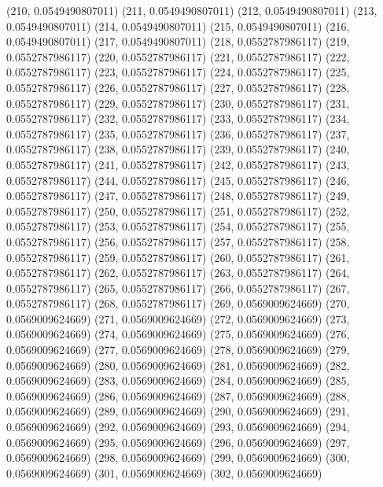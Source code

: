{					(210, 0.0549490807011)
					(211, 0.0549490807011)
					(212, 0.0549490807011)
					(213, 0.0549490807011)
					(214, 0.0549490807011)
					(215, 0.0549490807011)
					(216, 0.0549490807011)
					(217, 0.0549490807011)
					(218, 0.0552787986117)
					(219, 0.0552787986117)
					(220, 0.0552787986117)
					(221, 0.0552787986117)
					(222, 0.0552787986117)
					(223, 0.0552787986117)
					(224, 0.0552787986117)
					(225, 0.0552787986117)
					(226, 0.0552787986117)
					(227, 0.0552787986117)
					(228, 0.0552787986117)
					(229, 0.0552787986117)
					(230, 0.0552787986117)
					(231, 0.0552787986117)
					(232, 0.0552787986117)
					(233, 0.0552787986117)
					(234, 0.0552787986117)
					(235, 0.0552787986117)
					(236, 0.0552787986117)
					(237, 0.0552787986117)
					(238, 0.0552787986117)
					(239, 0.0552787986117)
					(240, 0.0552787986117)
					(241, 0.0552787986117)
					(242, 0.0552787986117)
					(243, 0.0552787986117)
					(244, 0.0552787986117)
					(245, 0.0552787986117)
					(246, 0.0552787986117)
					(247, 0.0552787986117)
					(248, 0.0552787986117)
					(249, 0.0552787986117)
					(250, 0.0552787986117)
					(251, 0.0552787986117)
					(252, 0.0552787986117)
					(253, 0.0552787986117)
					(254, 0.0552787986117)
					(255, 0.0552787986117)
					(256, 0.0552787986117)
					(257, 0.0552787986117)
					(258, 0.0552787986117)
					(259, 0.0552787986117)
					(260, 0.0552787986117)
					(261, 0.0552787986117)
					(262, 0.0552787986117)
					(263, 0.0552787986117)
					(264, 0.0552787986117)
					(265, 0.0552787986117)
					(266, 0.0552787986117)
					(267, 0.0552787986117)
					(268, 0.0552787986117)
					(269, 0.0569009624669)
					(270, 0.0569009624669)
					(271, 0.0569009624669)
					(272, 0.0569009624669)
					(273, 0.0569009624669)
					(274, 0.0569009624669)
					(275, 0.0569009624669)
					(276, 0.0569009624669)
					(277, 0.0569009624669)
					(278, 0.0569009624669)
					(279, 0.0569009624669)
					(280, 0.0569009624669)
					(281, 0.0569009624669)
					(282, 0.0569009624669)
					(283, 0.0569009624669)
					(284, 0.0569009624669)
					(285, 0.0569009624669)
					(286, 0.0569009624669)
					(287, 0.0569009624669)
					(288, 0.0569009624669)
					(289, 0.0569009624669)
					(290, 0.0569009624669)
					(291, 0.0569009624669)
					(292, 0.0569009624669)
					(293, 0.0569009624669)
					(294, 0.0569009624669)
					(295, 0.0569009624669)
					(296, 0.0569009624669)
					(297, 0.0569009624669)
					(298, 0.0569009624669)
					(299, 0.0569009624669)
					(300, 0.0569009624669)
					(301, 0.0569009624669)
					(302, 0.0569009624669)
}

